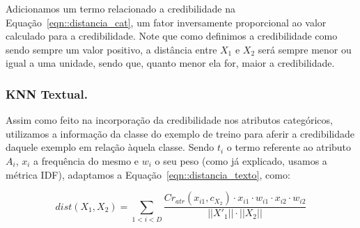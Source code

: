 Adicionamos um termo relacionado a credibilidade na Equação~\ref{eqn::distancia_cat}, um fator inversamente proporcional ao valor calculado para a credibilidade. Note que como definimos a credibilidade como sendo sempre um valor positivo, a distância entre $X_1$ e $X_2$ será sempre menor ou igual a uma unidade, sendo que, quanto menor ela for, maior a credibilidade. 


\subsubsection{\textsc{KNN} Textual.}
\label{subsubsec::knntexto}

Assim como feito na incorporação da credibilidade nos atributos categóricos, utilizamos a informação da classe do exemplo de treino para aferir a credibilidade daquele exemplo em relação àquela classe. Sendo $t_i$ o termo referente ao atributo $A_i$, $x_i$ a frequência do mesmo e $w_i$ o seu peso (como já explicado, usamos a métrica \textsc{IDF}), adaptamos a Equação~\ref{eqn::distancia_texto}, como:

\begin{equation}\label{eqn::distancia_texto_cat}
    dist(X_1, X_2) = \sum\limits_{1 < i < D}\frac{  Cr_{atr}(x_{i1}, c_{X_2}) \cdot x_{i1} \cdot w_{i1} \cdot x_{i2} \cdot w_{i2} }{ ||X'_1|| \cdot ||X_2|| }
\end{equation}

